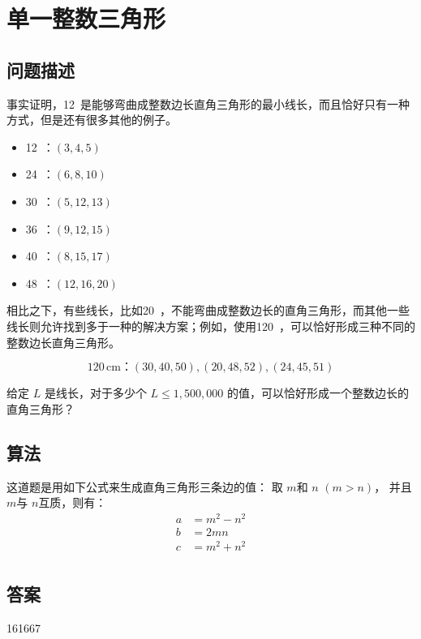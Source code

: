 \section{单一整数三角形}
\subsection{问题描述}
\begin{tcolorbox}
	事实证明，12\,  是能够弯曲成整数边长直角三角形的最小线长，而且恰好只有一种方式，但是还有很多其他的例子。

	\begin{itemize}[itemsep=0pt]
		\item  12\, ：\((3, 4, 5)\)
		\item  24\, ：\((6, 8, 10)\)
		\item  30\, ：\((5, 12, 13)\)
		\item  36\, ：\((9, 12, 15)\)
		\item  40\, ：\((8, 15, 17)\)
		\item  48\, ：\((12, 16, 20)\)
	\end{itemize}

	相比之下，有些线长，比如20\, ，不能弯曲成整数边长的直角三角形，而其他一些线长则允许找到多于一种的解决方案；例如，使用120\, ，可以恰好形成三种不同的整数边长直角三角形。

	\begin{equation*}
		120\, \text{cm}：(30, 40, 50), (20, 48, 52), (24, 45, 51)
	\end{equation*}

	给定 \( L \) 是线长，对于多少个 \( L \leq 1,500,000 \) 的值，可以恰好形成一个整数边长的直角三角形？

\end{tcolorbox}

\subsection{算法}
这道题是用如下公式来生成直角三角形三条边的值：
取 \( m \)和 \( n \) \( (m > n) \)， 并且 \( m \)与 \( n \)互质，则有：
\begin{align*}
	a & = m^2 - n^2 \\
	b & = 2mn       \\
	c & = m^2 + n^2 \\
\end{align*}

\subsection{答案}
161667
